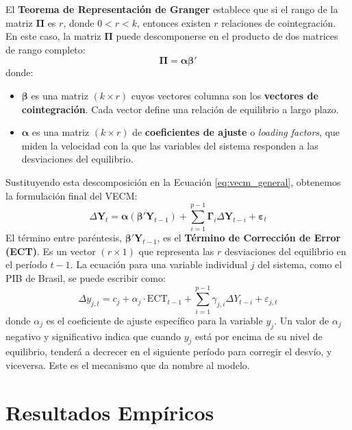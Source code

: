 \documentclass[12pt, a4paper]{article}
\begin{document}
El \textbf{Teorema de Representación de Granger} establece que si el rango de la matriz $\boldsymbol{\Pi}$ es $r$, donde $0 < r < k$, entonces existen $r$ relaciones de cointegración. En este caso, la matriz $\boldsymbol{\Pi}$ puede descomponerse en el producto de dos matrices de rango completo:
\begin{equation}
\boldsymbol{\Pi} = \boldsymbol{\alpha} \boldsymbol{\beta}'
\end{equation}
donde:
\begin{itemize}
    \item $\boldsymbol{\beta}$ es una matriz $(k \times r)$ cuyos vectores columna son los \textbf{vectores de cointegración}. Cada vector define una relación de equilibrio a largo plazo.
    \item $\boldsymbol{\alpha}$ es una matriz $(k \times r)$ de \textbf{coeficientes de ajuste} o \textit{loading factors}, que miden la velocidad con la que las variables del sistema responden a las desviaciones del equilibrio.
\end{itemize}
Sustituyendo esta descomposición en la Ecuación \ref{eq:vecm_general}, obtenemos la formulación final del VECM:
\begin{equation}
\Delta \mathbf{Y}_t = \boldsymbol{\alpha} (\boldsymbol{\beta}' \mathbf{Y}_{t-1}) + \sum_{i=1}^{p-1} \boldsymbol{\Gamma}_i \Delta \mathbf{Y}_{t-i} + \boldsymbol{\varepsilon}_t
\end{equation}
El término entre paréntesis, $\boldsymbol{\beta}' \mathbf{Y}_{t-1}$, es el \textbf{Término de Corrección de Error (ECT)}. Es un vector $(r \times 1)$ que representa las $r$ desviaciones del equilibrio en el período $t-1$. La ecuación para una variable individual $j$ del sistema, como el PIB de Brasil, se puede escribir como:
\begin{equation}
\Delta y_{j,t} = c_j + \alpha_j \cdot \text{ECT}_{t-1} + \sum_{i=1}^{p-1} \gamma_{j,i} \Delta Y_{t-i} + \varepsilon_{j,t}
\end{equation}
donde $\alpha_j$ es el coeficiente de ajuste específico para la variable $y_j$. Un valor de $\alpha_j$ negativo y significativo indica que cuando $y_j$ está por encima de su nivel de equilibrio, tenderá a decrecer en el siguiente período para corregir el desvío, y viceversa. Este es el mecanismo que da nombre al modelo.


\section{Resultados Empíricos}
\end{document}
